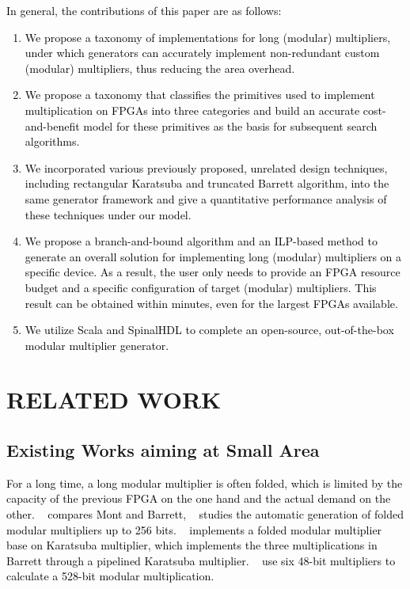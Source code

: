 \documentclass[conference]{IEEEtran}
\begin{document}
\textcolor{black}{
In general, the contributions of this paper are as follows:
\begin{enumerate}[1.]
    \item We propose a taxonomy of implementations for long (modular) multipliers, under which generators can accurately implement non-redundant custom (modular) multipliers, thus reducing the area overhead.
    \item We propose a taxonomy that classifies the primitives used to implement multiplication on FPGAs into three categories and build an accurate cost-and-benefit model for these primitives as the basis for subsequent search algorithms.
    \item We incorporated various previously proposed, unrelated design techniques, including rectangular Karatsuba and truncated Barrett algorithm, into the same generator framework and give a quantitative performance analysis of these techniques under our model.
    \item We propose a branch-and-bound algorithm and an ILP-based method to generate an overall solution for implementing long (modular) multipliers on a specific device. As a result, the user only needs to provide an FPGA resource budget and a specific configuration of target (modular) multipliers. This result can be obtained within minutes, even for the largest FPGAs available.
    \item We utilize Scala and SpinalHDL to complete an open-source, out-of-the-box modular multiplier generator.
\end{enumerate}
}


\section{RELATED WORK}

\subsection{Existing Works aiming at Small Area}

\textcolor{black}{
For a long time, a long modular multiplier is often folded, which is limited by the capacity of the previous FPGA on the one hand and the actual demand on the other. ~\cite{Comparison_of_Montgomery_and_Barrett_modular_multipliers_on_FPGAs} compares Mont and Barrett, ~\cite{Automatic_Generation_of_Modular_Multipliers_for_FPGA_Applications} studies the automatic generation of folded modular multipliers up to 256 bits. ~\cite{High_Throughput_FPGA_Implementation_of_256_bit_Montgomery_Modular_Multiplier} implements a folded modular multiplier base on Karatsuba multiplier, which implements the three multiplications in Barrett through a pipelined Karatsuba multiplier. ~\cite{A_High_Performance_Full_Word_Barrett_Multiplier_Designed_for_FPGAs_with_DSP_Resources} use six 48-bit multipliers to calculate a 528-bit modular multiplication.
}
\end{document}
